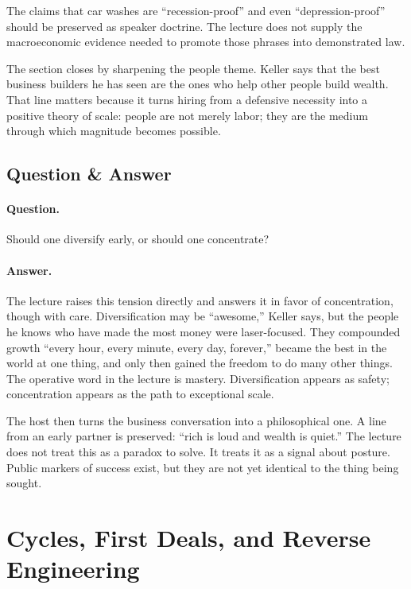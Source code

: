 \begin{remark}
The claims that car washes are ``recession-proof'' and even ``depression-proof'' should be preserved as speaker doctrine. The lecture does not supply the macroeconomic evidence needed to promote those phrases into demonstrated law.
\end{remark}

The section closes by sharpening the people theme. Keller says that the best business builders he has seen are the ones who help other people build wealth. That line matters because it turns hiring from a defensive necessity into a positive theory of scale: people are not merely labor; they are the medium through which magnitude becomes possible.

\subsection{Question \& Answer}

\paragraph{Question.} Should one diversify early, or should one concentrate?

\paragraph{Answer.} The lecture raises this tension directly and answers it in favor of concentration, though with care. Diversification may be ``awesome,'' Keller says, but the people he knows who have made the most money were laser-focused. They compounded growth ``every hour, every minute, every day, forever,'' became the best in the world at one thing, and only then gained the freedom to do many other things. The operative word in the lecture is mastery. Diversification appears as safety; concentration appears as the path to exceptional scale.

The host then turns the business conversation into a philosophical one. A line from an early partner is preserved: ``rich is loud and wealth is quiet.'' The lecture does not treat this as a paradox to solve. It treats it as a signal about posture. Public markers of success exist, but they are not yet identical to the thing being sought.

\section{Cycles, First Deals, and Reverse Engineering}

